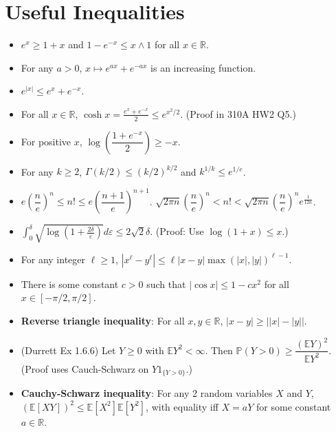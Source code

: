 \documentclass[twoside]{article}
\newcommand{\dis}{\displaystyle}
\newcommand\bbE{\mathbb{E}}
\newcommand\bbP{\mathbb{P}}
\newcommand\bbR{\mathbb{R}}
\newcommand\dlt{\delta}
\def\eps{\varepsilon}
\begin{document}
\section{Useful Inequalities}
\begin{itemize}
\item $e^x \geq 1 + x$ and $1 - e^{-x} \leq x \wedge 1$ for all $x \in \bbR$.

\item For any $a > 0$, $x \mapsto e^{ax} + e^{-ax}$ is an increasing function.

\item $e^{|x|} \leq e^x + e^{-x}$.

\item For all $x \in \bbR$, $\cosh x = \displaystyle\frac{e^x + e^{-x}}{2} \leq e^{x^2/2}$. (Proof in 310A HW2 Q5.)

\item For positive $x$, $\log \left(\dfrac{1 + e^{-x}}{2} \right) \geq -x$.

\item For any $k \geq 2$, $\Gamma(k/2) \leq (k/2)^{k/2}$ and $k^{1/k} \leq e^{1/e}$.

\item $e \left(\dfrac{n}{e}\right)^n \leq n! \leq e \left(\dfrac{n+1}{e}\right)^{n+1}$. $\sqrt{2\pi n} \left(\dfrac{n}{e}\right)^n < n! < \sqrt{2\pi n} \left(\dfrac{n}{e}\right)^n e^{\frac{1}{12n}}$.

\item $\dis\int_0^\dlt \sqrt{\log \left( 1 + \frac{2\dlt}{\eps}\right)} d\eps \leq 2\sqrt{2}\dlt$. (Proof: Use $\log (1+x) \leq x$.)

\item For any integer $\ell \geq 1$, $|x^\ell - y^\ell| \leq \ell |x-y| \max (|x|, |y|)^{\ell - 1}$.

\item There is some constant $c > 0$ such that $|\cos x| \leq 1 - cx^2$ for all $x \in [-\pi/2, \pi/2]$.

\item \textbf{Reverse triangle inequality}: For all $x, y \in \bbR$, $|x - y| \geq \bigg| |x| - |y| \bigg|$.

\item (Durrett Ex 1.6.6) Let $Y \geq 0$ with $\bbE Y^2 < \infty$. Then $\bbP(Y > 0) \geq \dfrac{(\bbE Y)^2}{\bbE Y^2}$. (Proof uses Cauch-Schwarz on $Y1_{\{Y > 0\}}$.)

\item \textbf{Cauchy-Schwarz inequality}: For any 2 random variables $X$ and $Y$, $(\bbE [XY])^2 \leq \bbE[X^2] \bbE [Y^2]$, with equality iff $X = aY$ for some constant $a \in \bbR$.


\end{itemize}
\end{document}
